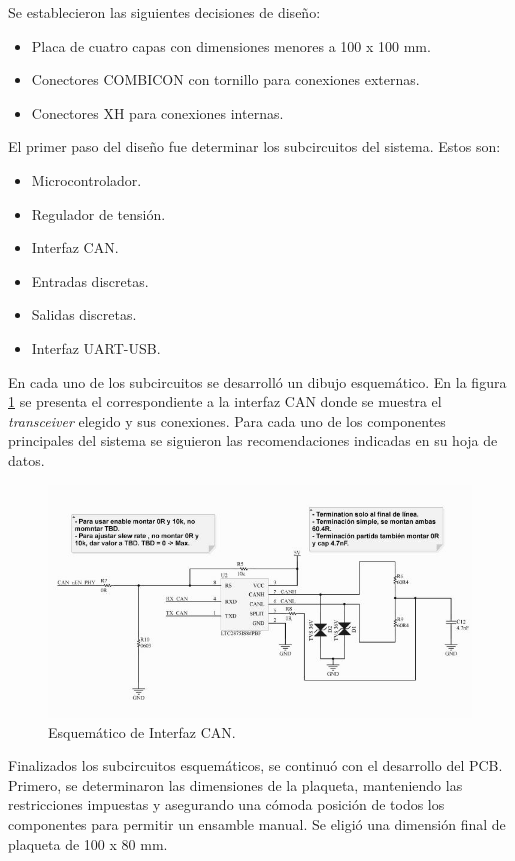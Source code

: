 Se establecieron las siguientes decisiones de diseño:
\begin{itemize}
	\item Placa de cuatro capas con dimensiones menores a 100 x 100 mm.
	\item Conectores COMBICON con tornillo\citep{web_combicon} para conexiones externas.
	\item Conectores XH\citep{web_xh_connector} para conexiones internas. 
\end{itemize} 

El primer paso del diseño fue determinar los subcircuitos del sistema. Estos son:
\begin{itemize}
	\item Microcontrolador.
	\item Regulador de tensión.
	\item Interfaz CAN.
	\item Entradas discretas.
	\item Salidas discretas.
	\item Interfaz UART-USB.
\end{itemize}

En cada uno de los subcircuitos se desarrolló un dibujo esquemático. En la figura \ref{fig:esquematico_can} se presenta el correspondiente a la interfaz CAN donde se muestra el \textit{transceiver} elegido y sus conexiones. Para cada uno de los componentes principales del sistema se siguieron las recomendaciones indicadas en su hoja de datos. 

\begin{figure}[htbp]
	\centering
	\includegraphics[scale=.7]{./Figures/sch_can.JPG}
	\caption{Esquemático de Interfaz CAN.}
	\label{fig:esquematico_can}
\end{figure}

Finalizados los subcircuitos esquemáticos, se continuó con el desarrollo del PCB. Primero, se determinaron las dimensiones de la plaqueta, manteniendo las restricciones impuestas y asegurando una cómoda posición de todos los componentes para permitir un ensamble manual. Se eligió una dimensión final de plaqueta de 100 x 80 mm. 

